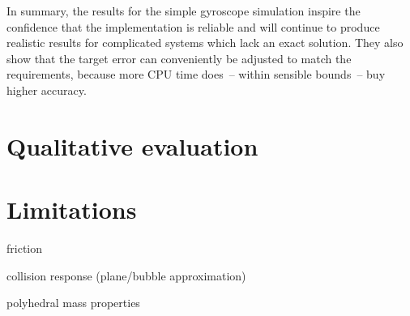 In summary, the results for the simple gyroscope simulation inspire the confidence that the
implementation is reliable and will continue to produce realistic results for complicated systems
which lack an exact solution. They also show that the target error can conveniently be adjusted
to match the requirements, because more CPU time does~-- within sensible bounds~-- buy higher
accuracy.


\section{Qualitative evaluation}


\section{Limitations}
friction

collision response (plane/bubble approximation)

polyhedral mass properties

